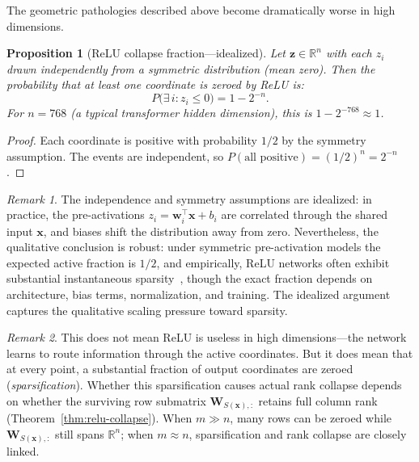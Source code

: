 \documentclass[11pt,a4paper]{article}
\newtheorem{proposition}[theorem]{Proposition}
\theoremstyle{remark}
\newtheorem{remark}{Remark}
\begin{document}
The geometric pathologies described above become dramatically worse in high dimensions.

\begin{proposition}[ReLU collapse fraction---idealized]
\label{prop:relu-fraction}
Let $\mathbf{z} \in \mathbb{R}^n$ with each $z_i$ drawn independently from a symmetric distribution (mean zero).
Then the probability that at least one coordinate is zeroed by ReLU is:
\begin{equation}
  P\bigl(\exists\, i : z_i \leq 0\bigr) = 1 - 2^{-n}.
  \label{eq:relu-prob}
\end{equation}
For $n = 768$ (a typical transformer hidden dimension), this is $1 - 2^{-768} \approx 1$.
\end{proposition}

\begin{proof}
Each coordinate is positive with probability $1/2$ by the symmetry assumption.
The events are independent, so $P(\text{all positive}) = (1/2)^n = 2^{-n}$.
\end{proof}

\begin{remark}
The independence and symmetry assumptions are idealized: in practice, the pre-activations $z_i = \mathbf{w}_i^\top \mathbf{x} + b_i$ are correlated through the shared input $\mathbf{x}$, and biases shift the distribution away from zero.
Nevertheless, the qualitative conclusion is robust: under symmetric pre-activation models the expected active fraction is $1/2$, and empirically, ReLU networks often exhibit substantial instantaneous sparsity~\cite{nair2010relu}, though the exact fraction depends on architecture, bias terms, normalization, and training.
The idealized argument captures the qualitative scaling pressure toward sparsity.
\end{remark}

\begin{remark}
This does not mean ReLU is useless in high dimensions---the network learns to route information through the active coordinates.
But it does mean that at every point, a substantial fraction of output coordinates are zeroed (\emph{sparsification}).
Whether this sparsification causes actual rank collapse depends on whether the surviving row submatrix $\mathbf{W}_{S(\mathbf{x}),:}$ retains full column rank (Theorem~\ref{thm:relu-collapse}).
When $m \gg n$, many rows can be zeroed while $\mathbf{W}_{S(\mathbf{x}),:}$ still spans $\mathbb{R}^n$; when $m \approx n$, sparsification and rank collapse are closely linked.
\end{remark}
\end{document}
